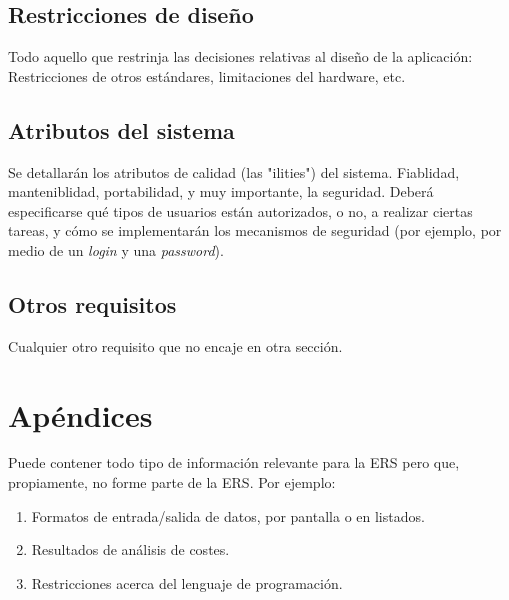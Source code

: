 \documentclass[12pt,a4paper, twosite]{article}
\begin{document}
\subsection{Restricciones de diseño}
\label{sec:org49fe900}


Todo aquello que restrinja las decisiones relativas al diseño de la
aplicación: Restricciones de otros estándares, limitaciones del
hardware, etc.


\subsection{Atributos del sistema}
\label{sec:orgd0babc0}

Se detallarán los atributos de calidad (las "ilities") del
sistema. Fiablidad, manteniblidad, portabilidad, y muy importante,
la seguridad. Deberá especificarse qué tipos de usuarios están
autorizados, o no, a realizar ciertas tareas, y cómo se
implementarán los mecanismos de seguridad (por ejemplo, por medio de
un \emph{login} y una \emph{password}).


\subsection{Otros requisitos}
\label{sec:org31d2978}

Cualquier otro requisito que no encaje en otra sección.

\newpage


\section{Apéndices}
\label{sec:org75cea03}

Puede contener todo tipo de información relevante para la ERS pero
que, propiamente, no forme parte de la ERS. Por ejemplo:

\begin{enumerate}
\item Formatos de entrada/salida de datos, por pantalla o en listados.

\item Resultados de análisis de costes.

\item Restricciones acerca del lenguaje de programación.
\end{enumerate}
\end{document}
